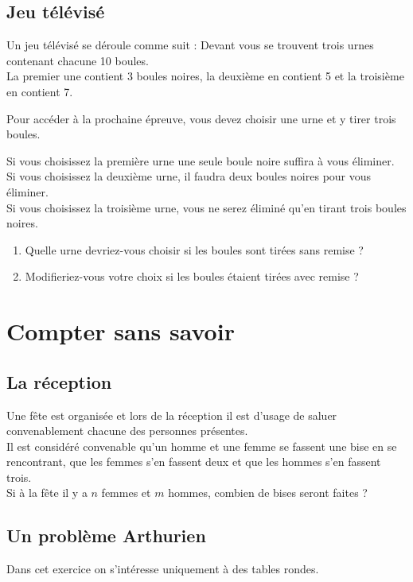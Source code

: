 \documentclass[oneside,12pt]{book}          %
\begin{document}
\subsection{Jeu télévisé}
Un jeu télévisé se déroule comme suit : Devant vous se trouvent trois urnes contenant chacune 10 boules.\\
La premier une contient 3 boules noires, la deuxième en contient 5 et la troisième en contient 7.

Pour accéder à la prochaine épreuve, vous devez choisir une urne et y tirer trois boules.

Si vous choisissez la première urne une seule boule noire suffira à vous éliminer.\\
Si vous choisissez la deuxième urne, il faudra deux boules noires pour vous éliminer.\\
Si vous choisissez la troisième urne, vous ne serez éliminé qu'en tirant trois boules noires.
\begin{enumerate}
    \item Quelle urne devriez-vous choisir si les boules sont tirées sans remise ?
    \item Modifieriez-vous votre choix si les boules étaient tirées avec remise ?
\end{enumerate}



\section{Compter sans savoir}

\subsection{La réception}
Une fête est organisée et lors de la réception il est d'usage de saluer convenablement chacune des personnes présentes.\\[5pt]
Il est considéré convenable qu'un homme et une femme se fassent une bise en se rencontrant, que les femmes s'en fassent deux et que les hommes s'en fassent trois.\\[5pt]
Si à la fête il y a $n$ femmes et $m$ hommes, combien de bises seront faites ?



\subsection{Un problème Arthurien}
Dans cet exercice on s'intéresse uniquement à des tables rondes.
\end{document}
